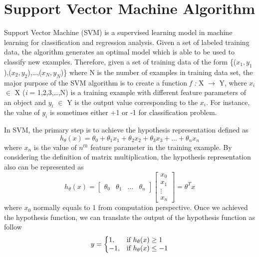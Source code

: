 \section{Support Vector Machine Algorithm}
Support Vector Machine (SVM) is a supervised learning model in machine learning for classification and regression analysis\cite{Cortes}. Given a set of labeled training data, the algorithm generates an optimal model which is able to be used to classify new examples. Therefore, given a set of training data of the form \{($x_1,y_1$),($x_2,y_2$),\ldots,($x_N,y_N$)\} where N is the number of examples in training data set, the major purpose of the SVM algorithm is to create a function 
\textit{f :} X $\rightarrow$ Y,
where $x_i$ $\in$ X (\textit{i} = 1,2,3,\ldots,N) is a training example with different feature parameters of an object and $y_i$ $\in$ Y is the output value corresponding to the $x_i$. For instance, the value of $y_i$ is sometimes either +1 or -1 for classification problem.   
\par
In SVM, the primary step is to achieve the hypothesis representation defined as 
\begin{equation}
    h_\theta(x) = \theta _0 + \theta_1x_1 + \theta_2x_2 + \theta_3x_3 + \dots + \theta_nx_n 
\end{equation}
where $x_n$ is the value of $n^{th}$ feature parameter in the training example. By considering the definition of matrix multiplication, the hypothesis representation also can be represented as 
\begin{equation}
    h_\theta(x) = 
    \begin{bmatrix}
        \theta_0 & \theta_1 & \dots & \theta_n
    \end{bmatrix}
    \begin{bmatrix}
        x_0\\
        x_1\\
        \vdots\\
        x_n
    \end{bmatrix}
    = \theta^Tx
\end{equation}
where $x_0$ normally equals to 1 from computation perspective. Once we achieved the hypothesis function, we can translate the output of the hypothesis function as follow 
\begin{equation}
     y=\left\{
  \begin{array}{@{}ll@{}}
    1, & \text{if}\ h_\theta(x) \geq 1 \\
    -1, & \text{if}\ h_\theta(x) \leq -1
  \end{array}\right.
\end{equation}
